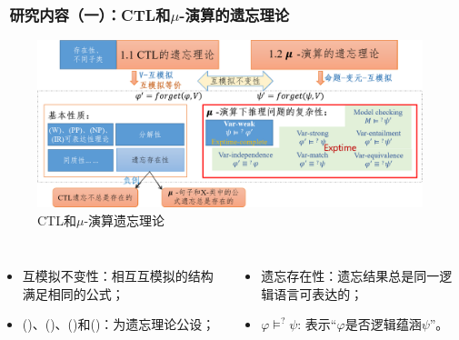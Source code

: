 \documentclass[9pt, CJK]{beamer}
\begin{document}
\begin{frame}  
	\frametitle{~研究内容（一）：CTL和$\mu$-演算的遗忘理论}
	\begin{figure}
		\includegraphics[scale=0.35]{figures/ctlMuForgFrame3}
		\caption{CTL和$\mu$-演算遗忘理论}
	\end{figure}
	{\tiny 
		\begin{columns}
			\begin{itemize} 
				\item 互模拟不变性：相互互模拟的结构满足相同的公式；
				\item (\W)、(\PP)、(\NgP)和(\IR)：为遗忘理论公设；
			\end{itemize}
			\begin{itemize}
				\item 遗忘存在性：遗忘结果总是同一逻辑语言可表达的；
				\item $\varphi \models^? \psi$: 表示“$\varphi$是否逻辑蕴涵$\psi$”。
			\end{itemize}
		\end{columns}
	} 
\end{frame}
\end{document}
